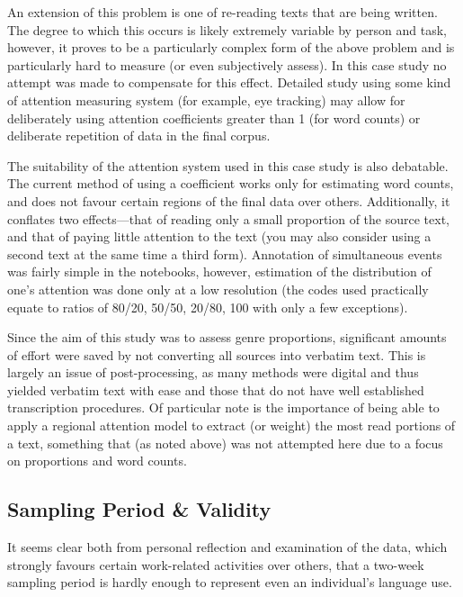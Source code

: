 An extension of this problem is one of re-reading texts that are being written.  The degree to which this occurs is likely extremely variable by person and task, however, it proves to be a particularly complex form of the above problem and is particularly hard to measure (or even subjectively assess).  In this case study no attempt was made to compensate for this effect.  Detailed study using some kind of attention measuring system (for example, eye tracking) may allow for deliberately using attention coefficients greater than 1 (for word counts) or deliberate repetition of data in the final corpus.


The suitability of the attention system used in this case study is also debatable.  The current method of using a coefficient works only for estimating word counts, and does not favour certain regions of the final data over others.  Additionally, it conflates two effects---that of reading only a small proportion of the source text, and that of paying little attention to the text (you may also consider using a second text at the same time a third form).  Annotation of simultaneous events was fairly simple in the notebooks, however, estimation of the distribution of one's attention was done only at a low resolution (the codes used practically equate to ratios of 80/20, 50/50, 20/80, 100 with only a few exceptions).






Since the aim of this study was to assess genre proportions, significant amounts of effort were saved by not converting all sources into verbatim text.  This is largely an issue of post-processing, as many methods were digital and thus yielded verbatim text with ease and those that do not have well established transcription procedures.  Of particular note is the importance of being able to apply a regional attention model to extract (or weight) the most read portions of a text, something that (as noted above) was not attempted here due to a focus on proportions and word counts.






\subsection{Sampling Period \& Validity}
It seems clear both from personal reflection and examination of the data, which strongly favours certain work-related activities over others, that a two-week sampling period is hardly enough to represent even an individual's language use.

